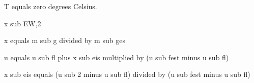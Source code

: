 T equals zero degrees Celsius.  

x sub EW,2  

x equals m sub g divided by m sub ges  

u equals u sub fl plus x sub eis multiplied by (u sub fest minus u sub fl)  

x sub eis equals (u sub 2 minus u sub fl) divided by (u sub fest minus u sub fl)